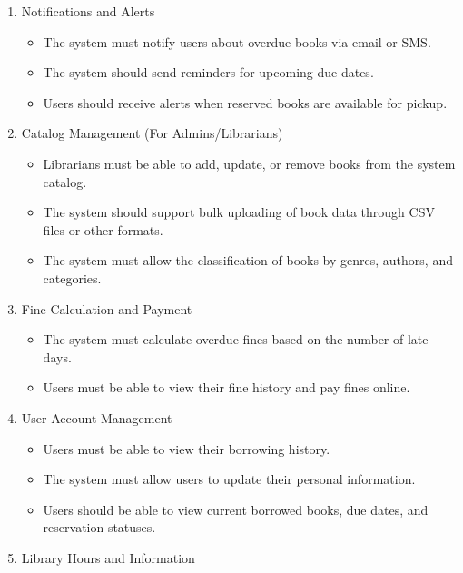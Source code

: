 \documentclass[a4paper]{article}
\begin{document}
\begin{enumerate}[(1)]
\begin{itemize}
            \end{itemize}
        \item Notifications and Alerts  
            \begin{itemize}
                \item  The system must notify users about overdue books via email or SMS.
                \item  The system should send reminders for upcoming due dates. 
                \item  Users should receive alerts when reserved books are available for pickup.
            \end{itemize}
        \item Catalog Management (For Admins/Librarians)  
            \begin{itemize}
                \item  Librarians must be able to add, update, or remove books from the system catalog.
                \item  The system should support bulk uploading of book data through CSV files or other formats.
                \item  The system must allow the classification of books by genres, authors, and categories.
            \end{itemize}
        \item Fine Calculation and Payment 
            \begin{itemize}
                \item  The system must calculate overdue fines based on the number of late days.
                \item  Users must be able to view their fine history and pay fines online.
            \end{itemize}
        \item User Account Management   
            \begin{itemize}
                \item  Users must be able to view their borrowing history.
                \item  The system must allow users to update their personal information.
                \item  Users should be able to view current borrowed books, due dates, and reservation statuses.
            \end{itemize}
        \item Library Hours and Information  
            \begin{itemize}

\end{itemize}
\end{enumerate}
\end{document}

